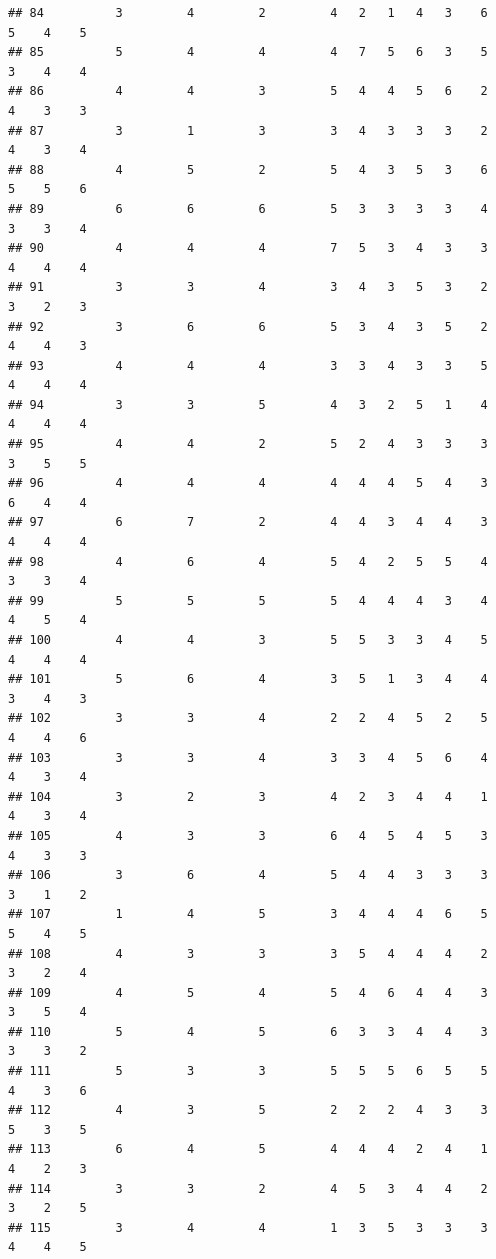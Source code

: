 \documentclass[
]{article}
\begin{document}
\begin{verbatim}
## 84          3         4         2         4   2   1   4   3    6    5    4    5
## 85          5         4         4         4   7   5   6   3    5    3    4    4
## 86          4         4         3         5   4   4   5   6    2    4    3    3
## 87          3         1         3         3   4   3   3   3    2    4    3    4
## 88          4         5         2         5   4   3   5   3    6    5    5    6
## 89          6         6         6         5   3   3   3   3    4    3    3    4
## 90          4         4         4         7   5   3   4   3    3    4    4    4
## 91          3         3         4         3   4   3   5   3    2    3    2    3
## 92          3         6         6         5   3   4   3   5    2    4    4    3
## 93          4         4         4         3   3   4   3   3    5    4    4    4
## 94          3         3         5         4   3   2   5   1    4    4    4    4
## 95          4         4         2         5   2   4   3   3    3    3    5    5
## 96          4         4         4         4   4   4   5   4    3    6    4    4
## 97          6         7         2         4   4   3   4   4    3    4    4    4
## 98          4         6         4         5   4   2   5   5    4    3    3    4
## 99          5         5         5         5   4   4   4   3    4    4    5    4
## 100         4         4         3         5   5   3   3   4    5    4    4    4
## 101         5         6         4         3   5   1   3   4    4    3    4    3
## 102         3         3         4         2   2   4   5   2    5    4    4    6
## 103         3         3         4         3   3   4   5   6    4    4    3    4
## 104         3         2         3         4   2   3   4   4    1    4    3    4
## 105         4         3         3         6   4   5   4   5    3    4    3    3
## 106         3         6         4         5   4   4   3   3    3    3    1    2
## 107         1         4         5         3   4   4   4   6    5    5    4    5
## 108         4         3         3         3   5   4   4   4    2    3    2    4
## 109         4         5         4         5   4   6   4   4    3    3    5    4
## 110         5         4         5         6   3   3   4   4    3    3    3    2
## 111         5         3         3         5   5   5   6   5    5    4    3    6
## 112         4         3         5         2   2   2   4   3    3    5    3    5
## 113         6         4         5         4   4   4   2   4    1    4    2    3
## 114         3         3         2         4   5   3   4   4    2    3    2    5
## 115         3         4         4         1   3   5   3   3    3    4    4    5

\end{verbatim}
\end{document}

